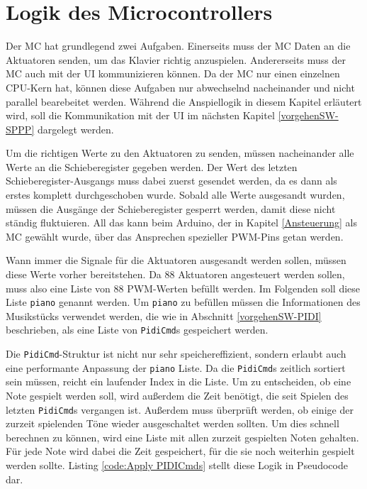 \section{Logik des Microcontrollers} \label{vorgehenSW-MC}

Der \ac{MC} hat grundlegend zwei Aufgaben.
Einerseits muss der \ac{MC} Daten an die Aktuatoren senden, um das Klavier richtig anzuspielen.
Andererseits muss der \ac{MC} auch mit der \ac{UI} kommunizieren können.
Da der \ac{MC} nur einen einzelnen CPU-Kern hat, können diese Aufgaben nur abwechselnd nacheinander und nicht parallel bearebeitet werden.
Während die Anspiellogik in diesem Kapitel erläutert wird, soll die Kommunikation mit der \ac{UI} im nächsten Kapitel \ref{vorgehenSW-SPPP} dargelegt werden.

Um die richtigen Werte zu den Aktuatoren zu senden, müssen nacheinander alle Werte an die Schieberegister gegeben werden.
Der Wert des letzten Schieberegister-Ausgangs muss dabei zuerst gesendet werden, da es dann als erstes komplett durchgeschoben wurde.
Sobald alle Werte ausgesandt wurden, müssen die Ausgänge der Schieberegister gesperrt werden, damit diese nicht ständig fluktuieren.
All das kann beim Arduino, der in Kapitel \ref{Ansteuerung} als \ac{MC} gewählt wurde, über das Ansprechen spezieller \ac{PWM}-Pins getan werden.


Wann immer die Signale für die Aktuatoren ausgesandt werden sollen, müssen diese Werte vorher bereitstehen.
Da 88 Aktuatoren angesteuert werden sollen, muss also eine Liste von 88 \ac{PWM}-Werten befüllt werden.
Im Folgenden soll diese Liste \lstinline{piano} genannt werden.
Um \lstinline{piano} zu befüllen müssen die Informationen des Musikstücks verwendet werden, die wie in Abschnitt \ref{vorgehenSW-PIDI} beschrieben, als eine Liste von \lstinline{PidiCmd}s gespeichert werden.

Die \lstinline{PidiCmd}-Struktur ist nicht nur sehr speichereffizient, sondern erlaubt auch eine performante Anpassung der \lstinline{piano} Liste.
Da die \lstinline{PidiCmd}s zeitlich sortiert sein müssen, reicht ein laufender Index in die Liste.
Um zu entscheiden, ob eine Note gespielt werden soll, wird außerdem die Zeit benötigt, die seit Spielen des letzten \lstinline{PidiCmd}s vergangen ist.
Außerdem muss überprüft werden, ob einige der zurzeit spielenden Töne wieder ausgeschaltet werden sollten.
Um dies schnell berechnen zu können, wird eine Liste mit allen zurzeit gespielten Noten gehalten.
Für jede Note wird dabei die Zeit gespeichert, für die sie noch weiterhin gespielt werden sollte.
Listing \ref{code:Apply PIDICmds} stellt diese Logik in Pseudocode dar.

